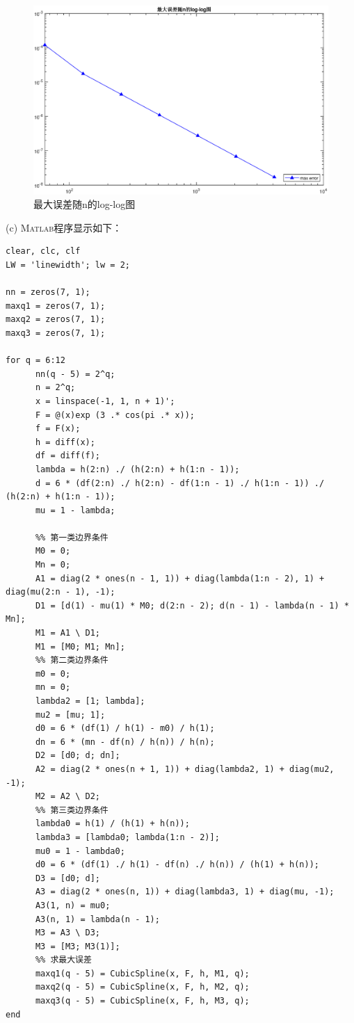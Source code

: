 \documentclass[12pt,a4paper,utf8]{ctexart}
\begin{document}
\begin{enumerate}
\begin{figure}[H]
	\centering
	\includegraphics[width=1\textwidth]{p2a2.eps}
	\caption{最大误差随n的log-log图}
\end{figure}
(c)
\textsc{Matlab}程序显示如下：
\begin{lstlisting}[frame=single]
clear, clc, clf
LW = 'linewidth'; lw = 2;

nn = zeros(7, 1);
maxq1 = zeros(7, 1);
maxq2 = zeros(7, 1);
maxq3 = zeros(7, 1);

for q = 6:12
      nn(q - 5) = 2^q;
      n = 2^q;
      x = linspace(-1, 1, n + 1)';
      F = @(x)exp (3 .* cos(pi .* x));
      f = F(x);
      h = diff(x);
      df = diff(f);
      lambda = h(2:n) ./ (h(2:n) + h(1:n - 1));
      d = 6 * (df(2:n) ./ h(2:n) - df(1:n - 1) ./ h(1:n - 1)) ./ (h(2:n) + h(1:n - 1));
      mu = 1 - lambda;
      
      %% 第一类边界条件
      M0 = 0;
      Mn = 0;
      A1 = diag(2 * ones(n - 1, 1)) + diag(lambda(1:n - 2), 1) + diag(mu(2:n - 1), -1);
      D1 = [d(1) - mu(1) * M0; d(2:n - 2); d(n - 1) - lambda(n - 1) * Mn];
      M1 = A1 \ D1;
      M1 = [M0; M1; Mn];
      %% 第二类边界条件
      m0 = 0;
      mn = 0;
      lambda2 = [1; lambda];
      mu2 = [mu; 1];
      d0 = 6 * (df(1) / h(1) - m0) / h(1);
      dn = 6 * (mn - df(n) / h(n)) / h(n);
      D2 = [d0; d; dn];
      A2 = diag(2 * ones(n + 1, 1)) + diag(lambda2, 1) + diag(mu2, -1);
      M2 = A2 \ D2;
      %% 第三类边界条件
      lambda0 = h(1) / (h(1) + h(n));
      lambda3 = [lambda0; lambda(1:n - 2)];
      mu0 = 1 - lambda0;
      d0 = 6 * (df(1) ./ h(1) - df(n) ./ h(n)) / (h(1) + h(n));
      D3 = [d0; d];
      A3 = diag(2 * ones(n, 1)) + diag(lambda3, 1) + diag(mu, -1);
      A3(1, n) = mu0;
      A3(n, 1) = lambda(n - 1);
      M3 = A3 \ D3;
      M3 = [M3; M3(1)];
      %% 求最大误差
      maxq1(q - 5) = CubicSpline(x, F, h, M1, q);
      maxq2(q - 5) = CubicSpline(x, F, h, M2, q);
      maxq3(q - 5) = CubicSpline(x, F, h, M3, q);
end


\end{lstlisting}
\end{enumerate}
\end{document}

